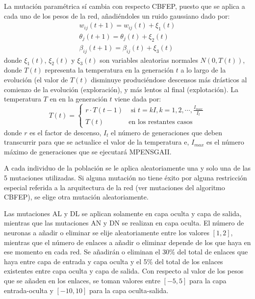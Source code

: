 La mutación paramétrica sí cambia con respecto CBFEP, puesto que se aplica a cada uno de
los pesos de la red, añadiéndoles un ruido gaussiano dado por:
\begin{gather} \nonumber
w_{ij}(t+1) = w_{ij}(t)+\xi_{1}(t)\\ \nonumber
\theta_j(t+1) = \theta_{j}(t)+\xi_{2}(t)\\ \nonumber
\beta_{ij}(t+1) = \beta_{ij}(t)+\xi_{3}(t) \nonumber
\end{gather}
donde $\xi_{1}(t)$, $\xi_{2}(t)$ y $\xi_{3}(t)$ son variables aleatorias normales
$N(0,T(t))$, donde $T(t)$ representa la temperatura en la generación $t$ a lo largo de la
evolución (el valor de $T(t)$ disminuye produciéndose descensos más drásticos al comienzo
de la evolución (exploración), y más lentos al final (explotación). La temperatura $T$ en
en la generación $t$ viene dada por:
\[
T(t)=
\begin{cases}
r \cdot T(t-1) & \text{ si } t=kI,k=1,2,\cdots,\frac{I_{max}}{I_{t}}\\
T(t) & \text{en los restantes casos}
\end{cases}
\]
donde $r$ es el factor de descenso, $I_{t}$ el número de
generaciones que deben transcurrir para que se actualice el valor de la temperatura e, $I_{max}$ es
el número máximo de generaciones que se ejecutará MPENSGAII.

A cada individuo de la población se le aplica aleatoriamente una y solo una de las 5
mutaciones utilizadas. Si alguna mutación no tiene éxito por alguna restricción especial
referida a la arquitectura de la red (ver mutaciones del algoritmo CBFEP), se
elige otra mutación aleatoriamente.

Las mutaciones AL y DL se aplican solamente en capa oculta y capa de salida, mientras que
las mutaciones AN y DN se realizan en capa oculta. El número de neuronas a añadir o
eliminar se elije aleatoriamente entre los valores $\left[1,2\right] $, mientras que el
número de enlaces a añadir o eliminar depende de los que haya en ese momento en cada red.
Se añadirán o eliminan el 30\% del total de enlaces que haya entre capa de entrada y capa
oculta y el 5\% del total de los enlaces existentes entre capa oculta y capa de salida.
Con respecto al valor de los pesos que se añaden en los enlaces, se toman valores entre
$\left[-5,5\right] $ para la capa entrada-oculta y $\left[ -10,10\right] $ para la capa
oculta-salida.

